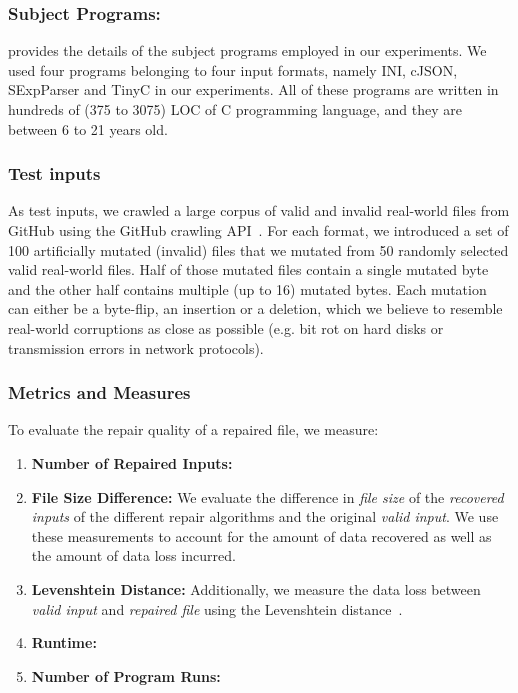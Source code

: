 \documentclass[sigconf,review,anonymous]{acmart}
\newcounter{todocounter}
\newcommand{\todo}[1]{\marginpar{$|$}\textcolor{red}{\stepcounter{todocounter}\footnote[\thetodocounter]{\textcolor{red}{\textbf{TODO }}\textit{#1}}}}
\renewcommand{\todo}[1]{}
\begin{document}
\subsubsection*{\bf Subject Programs:}  provides the details of the subject programs employed in our experiments. We used four programs belonging to four input formats, namely INI, cJSON, SExpParser and TinyC in our experiments. All of these programs are written in hundreds of (375 to 3075) LOC of C programming language, and they are between 6 to 21 years old.

\subsubsection*{\bf Test inputs}\todo{refactor this}
As test inputs, we crawled a large corpus of valid and invalid real-world files from GitHub using the GitHub crawling API~\cite{githubapi}.
For each format, we introduced a set of 100 artificially mutated (invalid) files that we mutated from 50 randomly selected valid real-world files.
Half of those mutated files contain a single mutated byte and the other half contains multiple (up to 16) mutated bytes.
Each mutation can either be a byte-flip, an insertion or a deletion, which we believe to resemble real-world corruptions as close as possible (e.g. bit rot on hard disks or transmission errors in network protocols).


\subsubsection*{\bf Metrics and Measures}
To evaluate the repair quality of a repaired file, we measure:
\begin{enumerate}
	\item \textbf{Number of Repaired Inputs:} \todo{discuss}
    \item \textbf{File Size Difference: } We evaluate the difference in \textit{file size} of the \emph{recovered inputs} of the different repair algorithms and the original \textit{valid input}.
    We use these measurements to account for the amount of data recovered as well as the amount of data loss incurred.
\item \textbf{Levenshtein Distance: } Additionally, we measure the data loss between \textit{valid input} and \textit{repaired file} using the Levenshtein distance~\cite{levDistance}.

\item \textbf{Runtime: } \todo{discuss}

\item \textbf{Number of Program Runs: } \todo{discuss}

\end{enumerate}
\end{document}
